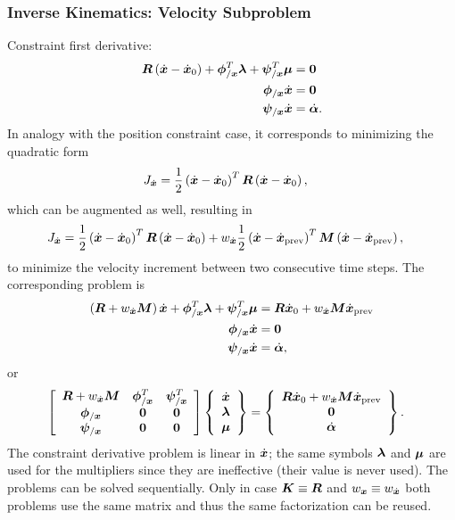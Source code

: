 \subsubsection{Inverse Kinematics: Velocity Subproblem}
Constraint first derivative:
\begin{subequations}
\begin{align}
	\TT{R} \plbr{\dot{\T{x}} - \dot{\T{x}}_0}
	+
	\T{\phi}_{/\T{x}}^T \T{\lambda}
	+
	\T{\psi}_{/\T{x}}^T \T{\mu}
	&=
	\T{0}
	\\
	\T{\phi}_{/\T{x}} \dot{\T{x}}
	&=
	\T{0}
	\\
	\T{\psi}_{/\T{x}} \dot{\T{x}}
	&=
	\dot{\T{\alpha}}
	.
\end{align}
\end{subequations}
In analogy with the position constraint case,
it corresponds to minimizing the quadratic form
\begin{align}
	J_{\dot{\T{x}}}
	&=
	\frac{1}{2} \plbr{\dot{\T{x}} - \dot{\T{x}}_0}^T \TT{R} \plbr{\dot{\T{x}} - \dot{\T{x}}_0}
	,
\end{align}
which can be augmented as well, resulting in
\begin{align}
	J_{\dot{\T{x}}}
	&=
	\frac{1}{2} \plbr{\dot{\T{x}} - \dot{\T{x}}_0}^T \TT{R} \plbr{\dot{\T{x}} - \dot{\T{x}}_0}
	+
	w_{\dot{\T{x}}} \frac{1}{2} \plbr{\dot{\T{x}} - \dot{\T{x}}_\text{prev}}^T \TT{M} \plbr{\dot{\T{x}} - \dot{\T{x}}_\text{prev}}
	,
\end{align}
to minimize the velocity increment between two consecutive time steps.
The corresponding problem is
\begin{subequations}
\begin{align}
	\plbr{\TT{R} + w_{\dot{\T{x}}} \TT{M}} \dot{\T{x}}
	+
	\T{\phi}_{/\T{x}}^T \T{\lambda}
	+
	\T{\psi}_{/\T{x}}^T \T{\mu}
	&=
	\TT{R} \dot{\T{x}}_0
	+
	w_{\dot{\T{x}}} \TT{M} \dot{\T{x}}_\text{prev}
	\\
	\T{\phi}_{/\T{x}} \dot{\T{x}}
	&=
	\T{0}
	\\
	\T{\psi}_{/\T{x}} \dot{\T{x}}
	&=
	\dot{\T{\alpha}}
	,
\end{align}
\end{subequations}
or
\begin{align}
	\sqbr{\matr{ccc}{
		\TT{R} + w_{\dot{\T{x}}} \TT{M} & \T{\phi}_{/\T{x}}^T & \T{\psi}_{/\T{x}}^T
		\\
		\T{\phi}_{/\T{x}} & \TT{0} & \TT{0}
		\\
		\T{\psi}_{/\T{x}} & \TT{0} & \TT{0}
	}} \cubr{\cvvect{
		\dot{\T{x}}
		\\
		\T{\lambda}
		\\
		\T{\mu}
	}}
	&=
	\cubr{\cvvect{
		\TT{R} \dot{\T{x}}_0 + w_{\dot{\T{x}}} \TT{M} \dot{\T{x}}_\text{prev}
		\\
		\T{0}
		\\
		\dot{\T{\alpha}}
	}}
	.
\end{align}
The constraint derivative problem is linear in $\dot{\T{x}}$;
the same symbols $\T{\lambda}$ and $\T{\mu}$ are used for the multipliers
since they are ineffective (their value is never used).
The problems can be solved sequentially.
Only in case $\TT{K} \equiv \TT{R}$ and $w_{\T{x}} \equiv w_{\dot{\T{x}}}$
both problems use the same matrix and thus the same factorization
can be reused.

